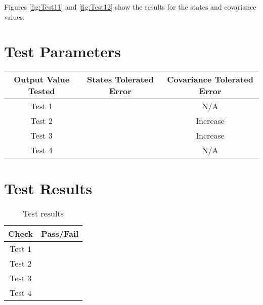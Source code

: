 Figures \ref{fig:Test11} and \ref{fig:Test12} show the results for the states and covariance values. 
 
 

\section{Test Parameters}

\begin{table}[ht]
\centering
\begin{tabular}{c|cc}
\hline
\hline
\textbf{Output Value Tested}     & \textbf{States Tolerated Error} & \textbf{Covariance Tolerated Error} \\ \hline
Test 1	        &         		 &  N/A                   \\
Test 2	   &      			 &  Increase                           \\
Test 3	     &      			 &  Increase                    \\
Test 4	 &      			 &  N/A            		     \\\hline
\end{tabular}
\end{table}

\section{Test Results}

\begin{table}[H]
	\caption{Test results}
	\label{tab:results}
	\centering \fontsize{10}{10}\selectfont
	\begin{tabular}{c | c}
		\hline\hline
		\textbf{Check} 			&\textbf{Pass/Fail} \\ 
		\hline
	   Test 1	   			&  \\ 
	   Test 2	   			&  \\ 
	   Test 3	   			&  \\ 
	   Test 4	   			&  \\ 
	   \hline\hline
	\end{tabular}
\end{table}
